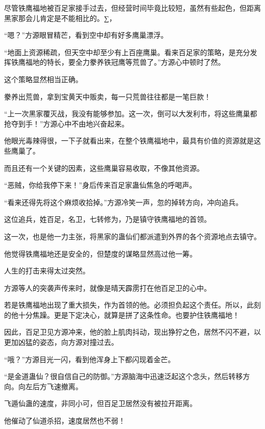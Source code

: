 
\begin{this_body}

尽管铁鹰福地被百足家接手过去，但经营时间毕竟比较短，虽然有些起色，但距离黑家那会儿肯定是不能相比的。∑，

“嗯？”方源眼冒精芒，看到空中却有好多鹰巢漂浮。

“地面上资源稀疏，但天空中却至少有上百座鹰巢。看来百足家的策略，是充分发挥铁鹰福地的特长，要全力豢养铁冠鹰等荒兽了。”方源心中顿时了然。

这个策略显然相当正确。

豢养出荒兽，拿到宝黄天中贩卖，每一只荒兽往往都是一笔巨款！

“上一次黑家覆灭战，我没有能够参加。这一次，倒可以大发利市，将这些鹰巢都抢夺到手！”方源心中不由地兴奋起来。

他眼光毒辣得很，一下子就看出来，在整个铁鹰福地中，最具有价值的资源就是这些鹰巢了。

而且还有一个关键的因素，这些鹰巢容易收取，不像其他资源。

“恶贼，你给我停下来！”身后传来百足家蛊仙焦急的呼喝声。

“看来还得先将这个麻烦收拾掉。”方源冷笑一声，忽的掉转方向，冲向追兵。

这位追兵，姓百足，名卫，七转修为，乃是镇守铁鹰福地的首领。

这一次，也是他一力主张，将黑家的蛊仙们都派遣到外界的各个资源地点去镇守。

他觉得铁鹰福地还是安全的，但楚度的谋略显然高过他一筹。

人生的打击来得太过突然。

方源等人的突袭声传来时，就像是晴天霹雳打在他百足卫的心中。

若是铁鹰福地出现了重大损失，作为首领的他。必须担负起这个责任。所以，此刻的他十分焦躁。更是下定决心，就算是拼了这条性命。也要护住铁鹰福地！

因此，百足卫见方源冲来，他的脸上肌肉抖动，现出狰狞之色，居然不闪不避，以更加凶猛的姿态，向方源对撞过去。

“哦？”方源目光一闪，看到他浑身上下都闪现着金芒。

“是金道蛊仙？很自信自己的防御。”方源脑海中迅速泛起这个念头，然后转移方向。向左后方飞速撤离。

飞遁仙蛊的速度，非同小可，但百足卫居然没有被拉开距离。

他催动了仙道杀招，速度居然也不弱！


\end{this_body}

